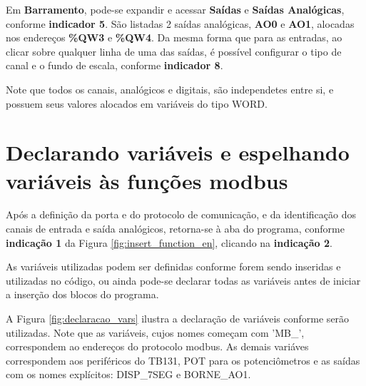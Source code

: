 Em \textbf{Barramento}, pode-se expandir e acessar 
\textbf{Saídas} e \textbf{Saídas Analógicas}, 
conforme \textbf{indicador 5}. 
São listadas 2 saídas analógicas, \textbf{AO0} e \textbf{AO1}, 
alocadas nos endereços \textbf{\%QW3} e \textbf{\%QW4}. 
Da mesma forma que para as entradas, 
ao clicar sobre qualquer linha de uma das saídas, 
é possível configurar o tipo de canal e o fundo de escala, conforme \textbf{indicador 8}. 

Note que todos os canais, analógicos e digitais, são independetes entre si, e possuem seus valores alocados em variáveis do tipo WORD. 





\section{ Declarando variáveis e espelhando variáveis às funções modbus}


\begin{figure}[ht!]
	\centering
\end{figure}


Após a definição da porta e do protocolo de comunicação, 
e da identificação dos canais de entrada e saída analógicos, 
retorna-se à aba do programa, 
conforme \textbf{indicação 1} da Figura \ref{fig:insert_function_en}, 
clicando na \textbf{indicação 2}.


As variáveis utilizadas podem ser definidas conforme forem sendo inseridas e utilizadas no código, ou ainda pode-se declarar todas as variáveis antes de iniciar a inserção dos blocos do programa. 


A Figura \ref{fig:declaracao_vars} ilustra a declaração de variáveis conforme serão utilizadas. 
Note que as variáveis, cujos nomes começam com 'MB\_', 
correspondem ao endereços do protocolo modbus. 
As demais variáves correspondem aos periféricos do TB131, 
POT para os potenciômetros e as saídas com os nomes explícitos: 
DISP\_7SEG e BORNE\_AO1.


